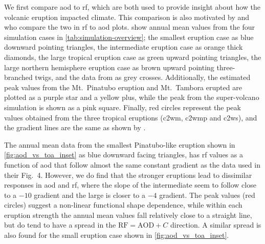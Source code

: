 \documentclass{ametsocV5}
\begin{document}
We first compare \ac{aod} to \ac{rf}, which are both used to provide insight about how
the volcanic eruption impacted climate. This comparison is also motivated by
\citet[][their Fig.\ 4]{gregory2016} and \citet[][their Fig.\ 1]{marshall2020} who
compare the two in \ac{rf} to \ac{aod} plots.  show annual
mean values from the four simulation cases in \cref{tab:simulation-overview}; the
smallest eruption case as blue downward pointing triangles, the intermediate eruption
case as orange thick diamonds, the large tropical eruption case as green upward pointing
triangles, the large northern hemisphere eruption case as brown upward pointing
three-branched twigs, and the data from \citet[][Fig.\ 4, black crosses from HadCM3
  sstPiHistVol]{gregory2016} as grey crosses. Additionally, the estimated peak values from
the Mt.\ Pinatubo eruption and Mt.\ Tambora erupted are plotted as a purple star and a
yellow plus, while the peak from the \citet{jones2005} super-volcano simulation is shown
as a pink square. Finally, red circles represent the peak values obtained from the three
tropical eruptions (\ac{c2wm}, \ac{c2wmp} and \ac{c2ws}), and the gradient lines are the
same as shown by \citet{gregory2016}.

The annual mean data from the smallest Pinatubo-like eruption shown in
\cref{fig:aod_vs_toa_inset} as blue downward facing triangles, has \ac{rf} values as a
function of \ac{aod} that follow almost the same constant gradient as the
\citet{gregory2016} data used in their Fig.\ 4. However, we do find that the stronger
eruptions lead to dissimilar responses in \ac{aod} and \ac{rf}, where the slope of the
intermediate seem to follow close to a \(-10\) gradient and the large is closer to a
\(-4\) gradient. The peak values (red circles) suggest a non-linear functional shape
dependence, while within each eruption strength the annual mean values fall relatively
close to a straight line, but do tend to have a spread in the
\(\mathrm{RF}=\mathrm{AOD}+C\) direction. A similar spread is also found for the small
eruption case shown in \cref{fig:aod_vs_toa_inset}.
\end{document}
